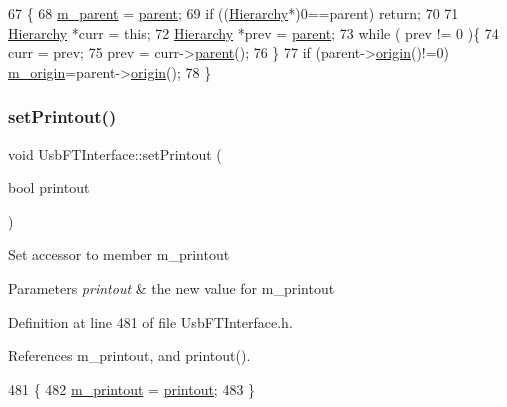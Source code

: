 \begin{DoxyCode}
67                                               \{
68   \hyperlink{classHierarchy_a5814bb280d4e8539ab25ab6cbfb9cc4f}{m\_parent} = \hyperlink{classHierarchy_a1c7bec8257e717f9c1465e06ebf845fc}{parent};
69   \textcolor{keywordflow}{if} ((\hyperlink{classHierarchy}{Hierarchy}*)0==parent) \textcolor{keywordflow}{return};
70 
71   \hyperlink{classHierarchy}{Hierarchy} *curr = \textcolor{keyword}{this};
72   \hyperlink{classHierarchy}{Hierarchy} *prev = \hyperlink{classHierarchy_a1c7bec8257e717f9c1465e06ebf845fc}{parent};
73   \textcolor{keywordflow}{while} ( prev != 0 )\{
74     curr = prev;
75     prev = curr->\hyperlink{classHierarchy_a1c7bec8257e717f9c1465e06ebf845fc}{parent}();
76   \}
77   \textcolor{keywordflow}{if} (parent->\hyperlink{classHierarchy_aee461dc930ce3871636ff87f075b1b83}{origin}()!=0) \hyperlink{classHierarchy_a16c73e557d3a7c156ffb5dc4102d148e}{m\_origin}=parent->\hyperlink{classHierarchy_aee461dc930ce3871636ff87f075b1b83}{origin}();
78 \}
\end{DoxyCode}
\mbox{\label{classUsbFTInterface_a6f31debb1d94a65deb3acb72e3608f27}} 
\subsubsection{\texorpdfstring{set\+Printout()}{setPrintout()}}
{\footnotesize\ttfamily void Usb\+F\+T\+Interface\+::set\+Printout (\begin{DoxyParamCaption}\item[{bool}]{printout }\end{DoxyParamCaption})\hspace{0.3cm}{\ttfamily [inline]}}

Set accessor to member m\+\_\+printout 
\begin{DoxyParams}{Parameters}
{\em printout} & the new value for m\+\_\+printout \\
\hline
\end{DoxyParams}


Definition at line 481 of file Usb\+F\+T\+Interface.\+h.



References m\+\_\+printout, and printout().


\begin{DoxyCode}
481                                    \{
482     \hyperlink{classUsbFTInterface_aa4d5f5ffb4d3b26f1effdf84087aea91}{m\_printout} = \hyperlink{classUsbFTInterface_ad312ac511dfb57c513f2998de396ba9b}{printout};
483   \}
\end{DoxyCode}
\mbox{\label{classUsbFTInterface_a63615ac245f36dc6a298228d8dcd31c4}} 
